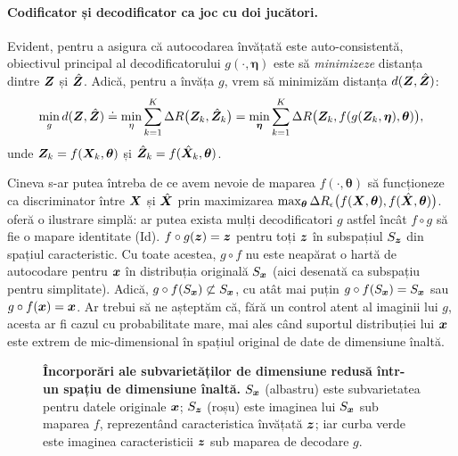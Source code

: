 \documentclass[../../book-main_ro.tex]{subfiles}
\begin{document}
\paragraph{Codificator și decodificator ca joc cu doi jucători.}
Evident, pentru a asigura că autocodarea învățată este auto-consistentă, obiectivul principal al decodificatorului $g(\cdot, \bm \eta)$ este să {\em minimizeze} distanța dintre $\bm{Z}$ și $\hat {\bm{Z}}$. Adică, pentru a învăța $g$, vrem să minimizăm distanța $d(\bm{Z}, \hat {\bm{Z}})$:
\begin{equation}
\min_g d(\bm{Z}, \hat {\bm{Z}}) \doteq \min_\eta  \sum_{k=1}^K \Delta R\big(\bm{Z}_k, \hat{\bm{Z}}_k\big) =  \min_{\bm \eta}  \sum_{k=1}^K \Delta R\big(\bm{Z}_k, f(g(\bm{Z}_k, \bm \eta),\bm \theta)\big),
\label{eqn:min-distance}
\end{equation}
unde $\bm{Z}_k = f(\bm{X}_k,\bm \theta)$ și $\hat {\bm{Z}}_k = f(\hat{\bm{X}}_k,\bm\theta)$.

\begin{example}
Cineva s-ar putea întreba de ce avem nevoie de maparea $f(\cdot, \bm \theta)$ să funcționeze ca discriminator între $\bm{X}$ și $\hat {\bm{X}}$ prin maximizarea $\max_{\bm \theta} \Delta R_\epsilon\big(f(\bm{X},\bm \theta), f(\hat {\bm{X}}, \bm \theta)\big)$.  oferă o ilustrare simplă: ar putea exista mulți decodificatori $g$ astfel încât $f\circ g$ să fie o mapare identitate (Id). $f\circ g(\bm{z}) = \bm{z} $ pentru toți $\bm{z}$ în subspațiul $S_{\bm{z}}$ din spațiul caracteristic. Cu toate acestea, $g\circ f$ nu este neapărat o hartă de autocodare pentru $\bm{x}$ în distribuția originală $S_{\bm{x}}$ (aici desenată ca subspațiu pentru simplitate). Adică, $g\circ f(S_{\bm{x}}) \not\subset S_{\bm{x}}$, cu atât mai puțin $g\circ f(S_{\bm{x}}) = S_{\bm{x}}$ sau $g\circ f(\bm{x}) = \bm{x}$. Ar trebui să ne așteptăm că, fără un control atent al imaginii lui $g$, acesta ar fi cazul cu probabilitate mare, mai ales când suportul distribuției lui $\bm{x}$ este extrem de mic-dimensional în spațiul original de date de dimensiune înaltă.
\end{example}
\begin{figure}
\caption{\textbf{{Încorporări} %
 ale subvarietăților de dimensiune redusă într-un spațiu de dimensiune înaltă.} $S_{\bm{x}}$ (albastru) este subvarietatea pentru datele originale $\bm{x}$; $S_{\bm{z}}$ (roșu) este imaginea lui $S_{\bm{x}}$ sub maparea $f$, reprezentând caracteristica învățată $\bm{z}$; iar curba verde este imaginea caracteristicii $\bm{z}$ sub maparea de decodare $g$.} \label{fig:decoder}
\end{figure}
\end{document}
